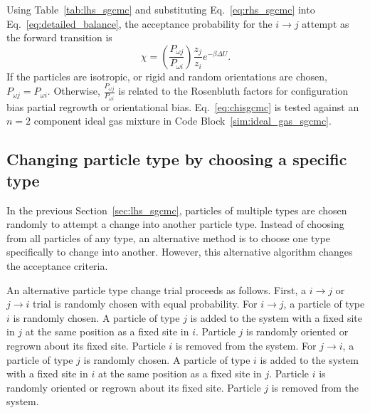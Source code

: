 \documentclass[
  9pt,
  bestpractices,
  pubversion,
]{livecoms}
\begin{document}
Using Table~\ref{tab:lhs_sgcmc} and substituting Eq.~\ref{eq:rhs_sgcmc} into Eq.~\ref{eq:detailed_balance}, the acceptance probability for the $i\rightarrow j$ attempt as the forward transition is
\begin{equation}
\chi = \left(\frac{P_{\omega j}}{P_{\omega i}}\right)\frac{z_j}{z_i}e^{-\beta\Delta U}.
\label{eq:chisgcmc}
\end{equation}
If the particles are isotropic, or rigid and random orientations are chosen, $P_{\omega j}=P_{\omega i}$.
Otherwise, $\frac{P_{\omega j}}{P_{\omega i}}$ is related to the Rosenbluth factors for configuration bias partial regrowth or orientational bias.
Eq.~\ref{eq:chisgcmc} is tested against an $n=2$ component ideal gas mixture in Code Block~\ref{sim:ideal_gas_sgcmc}.

\begin{figure}

\end{figure}

\subsection{\label{sec:lhs_sgcmc_alt}Changing particle type by choosing a specific type}

In the previous Section~\ref{sec:lhs_sgcmc}, particles of multiple types are chosen randomly to attempt a change into another particle type.
Instead of choosing from all particles of any type, an alternative method is to choose one type specifically to change into another.
However, this alternative algorithm changes the acceptance criteria.

An alternative particle type change trial proceeds as follows.
First, a $i \rightarrow j$ or $j \rightarrow i$ trial is randomly chosen with equal probability.
For $i \rightarrow j$, a particle of type $i$ is randomly chosen.
A particle of type $j$ is added to the system with a fixed site in $j$ at the same position as a fixed site in $i$.
Particle $j$ is randomly oriented or regrown about its fixed site.
Particle $i$ is removed from the system.
For $j \rightarrow i$, a particle of type $j$ is randomly chosen.
A particle of type $i$ is added to the system with a fixed site in $i$ at the same position as a fixed site in $j$.
Particle $i$ is randomly oriented or regrown about its fixed site.
Particle $j$ is removed from the system.
\end{document}
